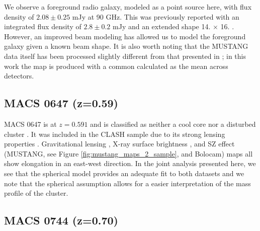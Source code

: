 We observe a foreground radio galaxy, modeled as a point source here, with flux density of $2.08 \pm 0.25$ mJy at 90 GHz. 
This was previously reported with an integrated flux density of $2.8 \pm 0.2$ mJy and an extended shape 14. $\times$ 16. 
\citep{mroczkowski2012}. However, an improved beam modeling has allowed us to model the foreground galaxy given a known beam shape. 
It is also worth
noting that the MUSTANG data itself has been processed slightly different from that presented in \citet{mroczkowski2012};
in this work the map is produced with a common calculated as the mean across detectors.



\subsection{MACS 0647 (z=0.59)}
\label{sec:results_m0647}


MACS 0647 is at $z = 0.591$ and is classified as neither a cool core nor a disturbed cluster \citep{sayers2013}. 
It was included in the CLASH sample due to its strong lensing properties \citep{postman2012}.
Gravitational lensing \citep{zitrin2011}, X-ray surface brightness \citep{mann2012}, 
and SZ effect (MUSTANG, see Figure \ref{fig:mustang_maps_2_sample}, and Bolocam) maps all
show elongation in an east-west direction. 
In the joint analysis presented here, we see that the spherical model provides an adequate fit to both datasets and we note 
that the spherical assumption allows for a easier interpretation of the mass profile of the cluster.


\subsection{MACS 0744 (z=0.70)}
\label{sec:results_m0744}

